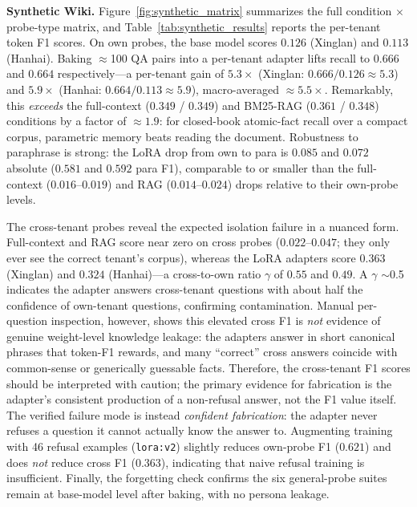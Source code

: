 \documentclass[conference]{IEEEtran}
\begin{document}
\textbf{Synthetic Wiki.} Figure~\ref{fig:synthetic_matrix} summarizes the full condition $\times$ probe-type matrix, and Table~\ref{tab:synthetic_results} reports the per-tenant token F1 scores. On own probes, the base model scores $0.126$ (Xinglan) and $0.113$ (Hanhai). Baking $\approx$100 QA pairs into a per-tenant adapter lifts recall to $0.666$ and $0.664$ respectively---a per-tenant gain of $5.3\times$ (Xinglan: $0.666/0.126 \approx 5.3$) and $5.9\times$ (Hanhai: $0.664/0.113 \approx 5.9$), macro-averaged $\approx 5.5\times$. Remarkably, this \emph{exceeds} the full-context ($0.349$ / $0.349$) and BM25-RAG ($0.361$ / $0.348$) conditions by a factor of $\approx 1.9$: for closed-book atomic-fact recall over a compact corpus, parametric memory beats reading the document. Robustness to paraphrase is strong: the LoRA drop from own to para is $0.085$ and $0.072$ absolute ($0.581$ and $0.592$ para F1), comparable to or smaller than the full-context ($0.016$--$0.019$) and RAG ($0.014$--$0.024$) drops relative to their own-probe levels.

The cross-tenant probes reveal the expected isolation failure in a nuanced form. Full-context and RAG score near zero on cross probes ($0.022$--$0.047$; they only ever see the correct tenant's corpus), whereas the LoRA adapters score $0.363$ (Xinglan) and $0.324$ (Hanhai)---a cross-to-own ratio $\gamma$ of $0.55$ and $0.49$. A $\gamma$ $\sim$0.5 indicates the adapter answers cross-tenant questions with about half the confidence of own-tenant questions, confirming contamination. Manual per-question inspection, however, shows this elevated cross F1 is \emph{not} evidence of genuine weight-level knowledge leakage: the adapters answer in short canonical phrases that token-F1 rewards, and many ``correct'' cross answers coincide with common-sense or generically guessable facts. Therefore, the cross-tenant F1 scores should be interpreted with caution; the primary evidence for fabrication is the adapter's consistent production of a non-refusal answer, not the F1 value itself. The verified failure mode is instead \textit{confident fabrication}: the adapter never refuses a question it cannot actually know the answer to. Augmenting training with 46 refusal examples (\texttt{lora:v2}) slightly reduces own-probe F1 ($0.621$) and does \emph{not} reduce cross F1 ($0.363$), indicating that naive refusal training is insufficient. Finally, the forgetting check confirms the six general-probe suites remain at base-model level after baking, with no persona leakage.
\end{document}
